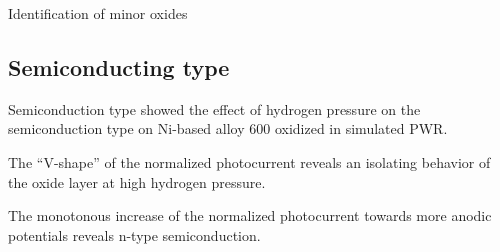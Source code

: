 \documentclass[10pt,compress]{beamer}
\begin{document}
\begin{frame}{Identification of minor oxides}
\begin{figure}[h]
            \label{fig_benaboud_minor_oxides}
        \end{figure}
    \end{frame}

\subsection{Semiconducting type}
    \begin{frame}{Semiconduction type}
            \citet{loucif2013} showed the effect of hydrogen pressure on 
            the semiconduction type on Ni-based alloy 600 oxidized in simulated PWR. 
            
            The “V-shape” of the normalized photocurrent 
            reveals an isolating behavior of the oxide layer at high hydrogen pressure. 
            
            The monotonous increase of the 
            normalized photocurrent towards more anodic potentials reveals 
            n-type semiconduction.


\end{frame}
\end{document}
